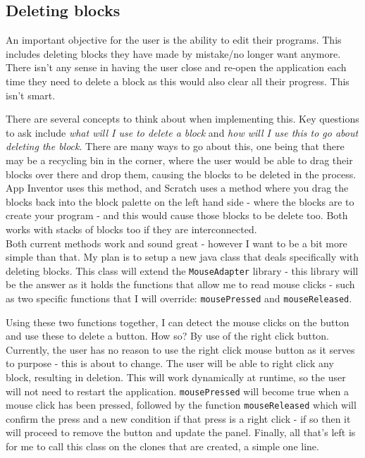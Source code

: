 \documentclass[a4paper, 12pt]{article}
\begin{document}
        \clearpage
        \subsection{Deleting blocks}
            An important objective for the user is the ability to edit their programs. This includes
            deleting blocks they have made by mistake/no longer want anymore. There isn't any
            sense in having the user close and re-open the application each time they need to
            delete a block as this would also clear all their progress. This isn't smart.

            There are several concepts to think about when implementing this. Key questions to
            ask include \textit{what will I use to delete a block} and \textit{how will I use this
            to go about deleting the block}. There are many ways to go about this, one being that there
            may be a recycling bin in the corner, where the user would be able to drag their blocks over
            there and drop them, causing the blocks to be deleted in the process. App Inventor uses this
            method, and Scratch uses a method where you drag the blocks back into the block palette on
            the left hand side - where the blocks are to create your program - and this would cause those
            blocks to be delete too. Both works with stacks of blocks too if they are interconnected. \\

            Both current methods work and sound great - however I want to be a bit more simple than that.
            My plan is to setup a new java class that deals specifically with deleting blocks. This class
            will extend the \texttt{MouseAdapter} library - this library will be the answer as it holds
            the functions that allow me to read mouse clicks - such as two specific functions that I will
            override: \texttt{mousePressed} and \texttt{mouseReleased}.

            Using these two functions together, I can detect the mouse clicks on the button and use these
            to delete a button. How so? By use of the right click button. Currently, the user has no
            reason to use the right click mouse button as it serves to purpose - this is about to change.
            The user will be able to right click any block, resulting in deletion. This will work
            dynamically at runtime, so the user will not need to restart the application.
            \texttt{mousePressed} will become true when a mouse click has been pressed, followed by the
            function \texttt{mouseReleased} which will confirm the press and a new condition if that press
            is a right click - if so then it will proceed to remove the button and update the panel. Finally,
            all that's left is for me to call this class on the clones that are created, a simple one line. \\
\end{document}
